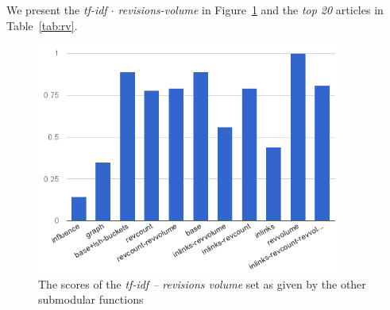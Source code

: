 We present the \emph{tf-idf \(\cdot\) revisions-volume} in Figure~\ref{img:rv}
and the \emph{top 20} articles in Table~\ref{tab:rv}.
\begin{figure}
  \centering
  \includegraphics[width=0.9\textwidth,natwidth=555,natheight=419]{images/rv.png}
  \caption{The scores of the \emph{tf-idf -- revisions volume} set as given by
  the other submodular functions}
  \label{img:rv}
\end{figure}

